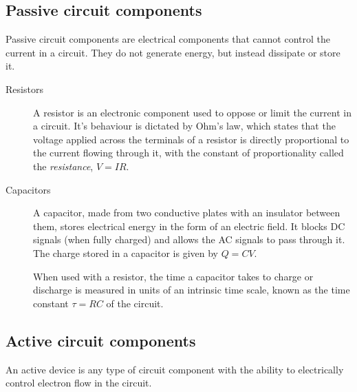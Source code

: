 \subsection*{Passive circuit components}

Passive circuit components are electrical components that cannot control the current in a circuit. They do not generate energy, but instead dissipate or store it.

\begin{description}
\item[Resistors] A resistor is an electronic component used to oppose or limit the current in a circuit. It's behaviour is dictated by Ohm’s law, which states that the voltage applied across the terminals of a resistor is directly proportional to the current flowing through it, with the constant of proportionality called the \textit{resistance}, $V=IR$.


\item[Capacitors]

A capacitor, made from two conductive plates with an insulator between them, stores electrical energy in the form of an electric field. It blocks DC signals (when fully charged) and allows the AC signals to pass through it. The charge stored in a capacitor is given by $Q=CV$.


When used with a resistor, the time a capacitor takes to charge or discharge is measured in units of an intrinsic time scale, known as the time constant $\tau = RC$ of the circuit.

\end{description}



\subsection*{Active circuit components}
An active device is any type of circuit component with the ability to electrically control electron flow in the circuit.

